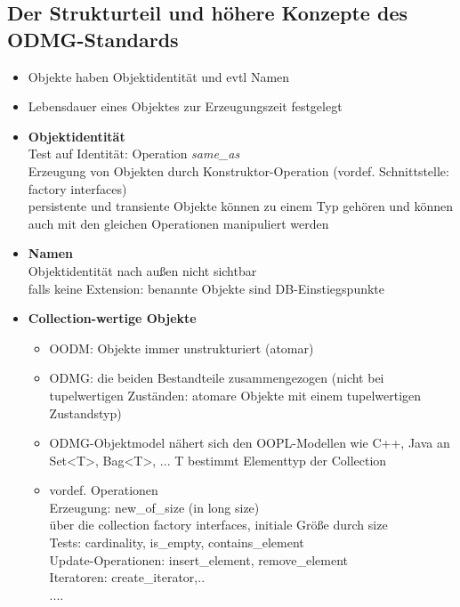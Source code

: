 \subsection{Der Strukturteil und höhere Konzepte des ODMG-Standards}
\begin{itemize}
	\item Objekte haben Objektidentität und evtl Namen
	\item Lebensdauer eines Objektes zur Erzeugungszeit festgelegt
	\item \textbf{Objektidentität}\\
	Test auf Identität: Operation \textit{same\_as}\\
	Erzeugung von Objekten durch Konstruktor-Operation (vordef. Schnittstelle: factory interfaces)\\
	persistente und transiente Objekte können zu einem Typ gehören und können auch mit den gleichen Operationen manipuliert werden
	
	\item \textbf{Namen}\\
	Objektidentität nach außen nicht sichtbar\\
	falls keine Extension: benannte Objekte sind DB-Einstiegspunkte
	
	\item \textbf{Collection-wertige Objekte}
	\begin{itemize}
		\item OODM: Objekte immer unstrukturiert (atomar)
		\item ODMG: die beiden Bestandteile zusammengezogen (nicht bei tupelwertigen Zuständen: atomare Objekte mit einem tupelwertigen Zustandstyp)
		\item ODMG-Objektmodel nähert sich den OOPL-Modellen wie C++, Java an\\
		Set<T>, Bag<T>, ... T bestimmt Elementtyp der Collection
		
		\item vordef. Operationen\\
		Erzeugung: new\_of\_size (in long size)\\
		über die collection factory interfaces, initiale Größe durch size\\
		Tests: cardinality, is\_empty, contains\_element\\
		Update-Operationen: insert\_element, remove\_element\\
		Iteratoren: create\_iterator,..\\
		....
	\end{itemize}
	

\end{itemize}
